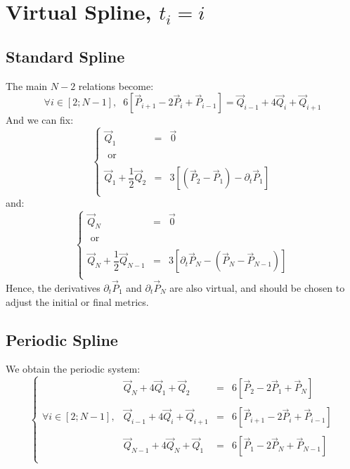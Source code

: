 \documentclass[aps,10pt]{revtex4}
\begin{document}
\section{Virtual Spline, $t_i=i$}

\subsection{Standard Spline}
The main $N-2$ relations become:
\begin{equation}
	\forall i \in[2;N-1],\;\;6\left[\vec{P}_{i+1} - 2 \vec{P}_i + \vec{P}_{i-1}\right] =  \vec{Q}_{i-1} + 4 \vec{Q}_i + \vec{Q}_{i+1}
\end{equation}
And we can fix:
\begin{equation}
\left\lbrace
\begin{array}{rcl}
\vec{Q}_1 & = & \vec{0} \\
\\
\text{ or }\\
\\
\vec{Q}_1 + \dfrac{1}{2}\vec{Q}_2 & = & 3\left[\left(\vec{P}_2-\vec{P}_1\right) - \partial_t \vec{P}_1\right]\\
\end{array}
\right.
\end{equation}
and:
\begin{equation}
\left\lbrace
\begin{array}{rcl}
\vec{Q}_N & = & \vec{0} \\
\\
\text{ or }\\
\\
\vec{Q}_N + \dfrac{1}{2}\vec{Q}_{N-1} & = & 3\left[\partial_t \vec{P}_{N} - \left(\vec{P}_N-\vec{P}_{N-1}\right)  \right]\\
\end{array}
\right.
\end{equation}
Hence, the derivatives $\partial_t \vec{P}_1$ and $\partial_t \vec{P}_N$ are also virtual, and should be chosen to adjust the initial or final metrics.

\subsection{Periodic Spline}
We obtain the periodic system:
\begin{equation}
\left\lbrace
\begin{array}{lccl}
 & \vec{Q}_{N} + 4 \vec{Q}_1 + \vec{Q}_{2} & = & 6\left[\vec{P}_{2} - 2 \vec{P}_1 + \vec{P}_{N}\right] \\
 \\
 \forall i \in[2;N-1], & \vec{Q}_{i-1} + 4 \vec{Q}_i + \vec{Q}_{i+1} & = & 6\left[\vec{P}_{i+1} - 2 \vec{P}_i + \vec{P}_{i-1}\right] \\
 \\
 & \vec{Q}_{N-1} + 4 \vec{Q}_N + \vec{Q}_{1} & = & 6\left[\vec{P}_{1} - 2 \vec{P}_N + \vec{P}_{N-1}\right] \\
\end{array}
\right.
\end{equation}
\end{document}
